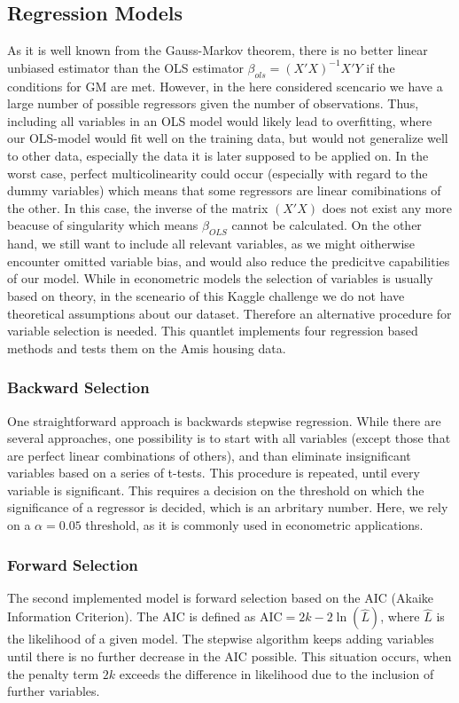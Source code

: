 \subsection{Regression Models}
As it is well known from the Gauss-Markov theorem, there is no better linear unbiased estimator than the OLS estimator $\beta_{ols} = (X'X)^{-1}X'Y$  if the conditions for GM are met. However, in the here considered scencario we have a large number of possible regressors given the number of observations. Thus, including all variables in an OLS model would likely lead to overfitting, where our OLS-model would fit well on the training data, but would not generalize well to other data, especially the data it is later supposed to be applied on. In the worst case, perfect multicolinearity could occur (especially with regard to the dummy variables)  which means that some regressors are linear comibinations of the other. In this case, the inverse of the matrix $(X'X)$ does not exist any more beacuse of singularity which means $\beta_{OLS}$ cannot be calculated.  
On the other hand, we still want to include all relevant variables, as we might oitherwise encounter omitted variable bias, and would also reduce the predicitve capabilities of our model. 
While in econometric models  the selection of variables is usually based on theory, in the sceneario of this Kaggle challenge we do not have theoretical assumptions about our dataset. Therefore an alternative procedure for variable selection is needed. This quantlet implements four regression based methods and tests them on the Amis housing data. 

\subsubsection{Backward Selection}
One straightforward approach is backwards stepwise regression. While there are several approaches, one possibility is to  start with all variables (except those that are perfect linear combinations of others), and than eliminate insignificant variables based on a series of  t-tests. This procedure is repeated, until every variable is significant. This requires a decision on the threshold on which the significance of a regressor is decided, which is an arbritary number. Here, we rely on a $\alpha = 0.05$ threshold, as it is commonly used in econometric applications. 

\subsubsection{Forward Selection}
The second implemented model is forward selection based on the AIC (Akaike Information Criterion). The AIC is defined as 
${\displaystyle \mathrm{AIC}=2k-2\ln({\hat{L}})}$, where $\hat{L}$ is the likelihood of a given model. The stepwise algorithm keeps adding variables until there is no further decrease in the AIC possible. This situation occurs, when the penalty term $2k$ exceeds the difference in likelihood due to the inclusion of further variables. 


